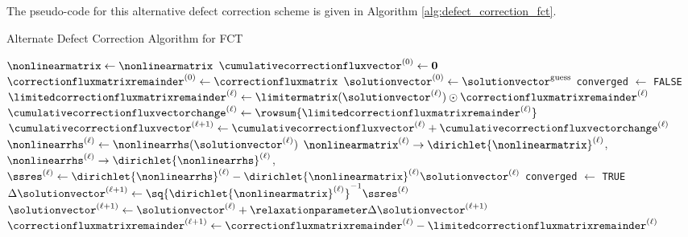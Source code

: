 The pseudo-code for this alternative defect correction scheme is given
in Algorithm \ref{alg:defect_correction_fct}.

\begin{algorithm}[H]
\caption{Alternate Defect Correction Algorithm for FCT}
\label{alg:defect_correction_fct}
\begin{algorithmic}
\State $\nonlinearmatrix \gets \nonlinearmatrix$
\State $\cumulativecorrectionfluxvector^{(0)} \gets \mathbf{0}$
\State $\correctionfluxmatrixremainder^{(0)} \gets \correctionfluxmatrix$
\State $\solutionvector^{(0)} \gets \solutionvector^{\text{guess}}$
\State \texttt{converged} $\gets$ \texttt{FALSE}
  \State $\limitedcorrectionfluxmatrixremainder^{(\ell)} \gets
    \limitermatrix(\solutionvector^{(\ell)})\odot
    \correctionfluxmatrixremainder^{(\ell)}$
  \State $\cumulativecorrectionfluxvectorchange^{(\ell)} \gets
    \rowsum{\limitedcorrectionfluxmatrixremainder^{(\ell)}}$
  \State $\cumulativecorrectionfluxvector^{(\ell+1)} \gets
    \cumulativecorrectionfluxvector^{(\ell)}
    + \cumulativecorrectionfluxvectorchange^{(\ell)}$
  \State $\nonlinearrhs^{(\ell)} \gets
    \nonlinearrhs(\solutionvector^{(\ell)})$
  \State $\nonlinearmatrix^{(\ell)} \rightarrow
    \dirichlet{\nonlinearmatrix}^{(\ell)}$,
    $\nonlinearrhs^{(\ell)} \rightarrow \dirichlet{\nonlinearrhs}^{(\ell)}$,
  \State $\ssres^{(\ell)} \gets \dirichlet{\nonlinearrhs}^{(\ell)}
    - \dirichlet{\nonlinearmatrix}^{(\ell)}\solutionvector^{(\ell)}$
    \State \texttt{converged} $\gets$ \texttt{TRUE}
    \Break
  \EndIf
  \State $\Delta\solutionvector^{(\ell+1)}
    \gets \sq{\dirichlet{\nonlinearmatrix}^{(\ell)}}^{-1}\ssres^{(\ell)}$
  \State $\solutionvector^{(\ell+1)} \gets \solutionvector^{(\ell)}
    + \relaxationparameter\Delta\solutionvector^{(\ell+1)}$
  \State $\correctionfluxmatrixremainder^{(\ell+1)} \gets 
    \correctionfluxmatrixremainder^{(\ell)}
    - \limitedcorrectionfluxmatrixremainder^{(\ell)}$
\EndFor
{}
\EndIf
\end{algorithmic}
\end{algorithm}
